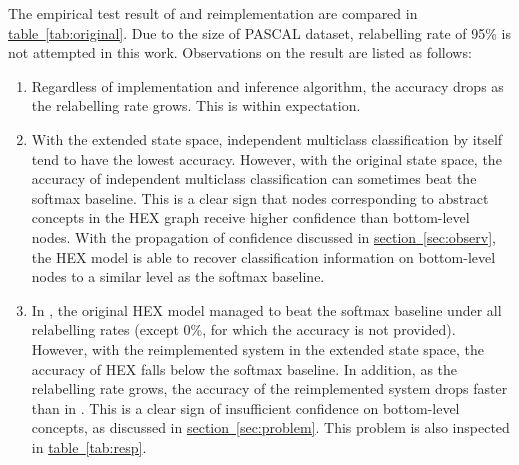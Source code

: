 \documentclass[11pt,a4paper]{article}
\begin{document}
The empirical test result of \cite{deng2014large} and reimplementation are compared in \hyperref[tab:original]{table~\ref{tab:original}}. Due to the size of PASCAL dataset, relabelling rate of 95\% is not attempted in this work. Observations on the result are listed as follows:
\begin{enumerate}
\item Regardless of implementation and inference algorithm, the accuracy drops as the relabelling rate grows. This is within expectation.
\item With the extended state space, independent multiclass classification by itself tend to have the lowest accuracy. However, with the original state space, the accuracy of independent multiclass classification can sometimes beat the softmax baseline. This is a clear sign that nodes corresponding to abstract concepts in the HEX graph receive higher confidence than bottom-level nodes. With the propagation of confidence discussed in \hyperref[sec:observ]{section~\ref{sec:observ}}, the HEX model is able to recover classification information on bottom-level nodes to a similar level as the softmax baseline.
\item In \cite{deng2014large}, the original HEX model managed to beat the softmax baseline under all relabelling rates (except 0\%, for which the accuracy is not provided). However, with the reimplemented system in the extended state space, the accuracy of HEX falls below the softmax baseline. In addition, as the relabelling rate grows, the accuracy of the reimplemented system drops faster than in \cite{deng2014large}. This is a clear sign of insufficient confidence on bottom-level concepts, as discussed in \hyperref[sec:problem]{section~\ref{sec:problem}}. This problem is also inspected in \hyperref[tab:resp]{table~\ref{tab:resp}}.
\end{enumerate}
\end{document}
